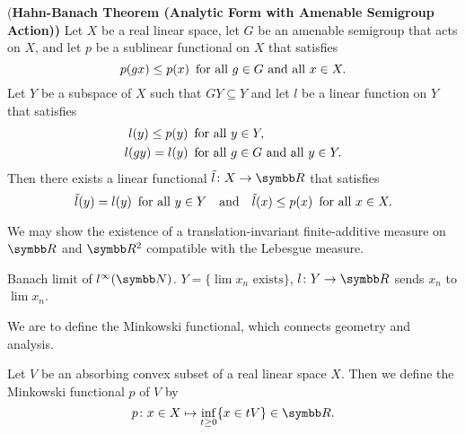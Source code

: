 \begin{theorem}{(\bf Hahn-Banach Theorem (Analytic Form with Amenable Semigroup Action))}
  Let $X$ be a real linear space, let $G$ be an amenable semigroup that acts on $X$, and let $p$ be a sublinear functional on $X$ that satisfies
  \begin{equation*}
    p(gx)\leq p(x) \text{\enskip for all } g\in G \text{ and all } x\in X.
  \end{equation*}
  Let $Y$ be a subspace of $X$ such that $GY\subseteq Y$ and let $l$ be a linear function on $Y$ that satisfies
  \begin{equation*}
    \begin{aligned}
      l(y)\leq p(y) &\text{\enskip for all } y\in Y,\\
      l(gy)=l(y)&\text{\enskip for all } g\in G \text{ and all }y\in Y.
    \end{aligned}
  \end{equation*}
  Then there exists a linear functional $\tilde l\colon X\to\RR$ that satisfies
  \begin{equation*}
    \tilde l(y)=l(y)\text{\enskip for all }y\in Y\text{\quad and\quad} \tilde l(x)\leq p(x) \text{\enskip for all } x\in X.
  \end{equation*}
\end{theorem}

\begin{example}
  We may show the existence of a translation-invariant finite-additive measure on $\RR$ and $\RR^2$ compatible with the Lebesgue measure.
\end{example}

\begin{example}
  Banach limit of $l^\infty(\NN)$. $Y=\{\lim x_n \text{ exists}\}$, $l\colon Y\to\RR$ sends $x_n$ to $\lim x_n$.
\end{example}

We are to define the Minkowski functional, which connects geometry and analysis.

\begin{definition}
  Let $V$ be an absorbing convex subset of a real linear space $X$. Then we define the Minkowski functional $p$ of $V$ by
  \begin{equation*}
    p\colon x\in X\mapsto \inf_{t\geq 0}\{x\in tV\}\in\RR.
  \end{equation*}
\end{definition}

